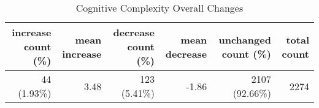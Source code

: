 \begin{table*}[]
    \centering
    \begin{tabular}{r|r|r|r|r|r}
    \toprule
         \textbf{increase count (\%)} & \textbf{mean increase} & \textbf{decrease count (\%)} & \textbf{mean decrease} & \textbf{unchanged count (\%)} & \textbf{total count}\\
         \midrule
44 (1.93\%)& 3.48 & 123 (5.41\%)& -1.86 & 2107 (92.66\%)& 2274\\
\bottomrule
    \end{tabular}
    \caption{Cognitive Complexity Overall Changes}
    \label{tab:my_label}
\end{table*}